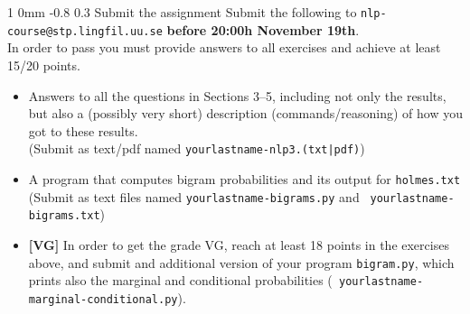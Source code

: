 \documentclass[11pt]{article}
\makeatletter
\newcommand{\newsec}[2]{\section{#1}\label{sec:#2}\noindent}
\renewcommand{\section}{\@startsection
{section}%
{1}%
{0mm}%
{-0.8\baselineskip}%
{0.3\baselineskip}%
{\bfseries\large}}%
\makeatother
\begin{document}
\newsec{Submit the assignment}{submit}%
Submit the following to {\tt nlp-course@stp.lingfil.uu.se} {\bf before
  20:00h November 19th}.\\In order to pass you must provide answers to
all exercises and achieve at least 15/20 points.
\begin{itemize}[noitemsep,topsep=0.2cm]
\item Answers to all the questions in Sections 3--5, including not
  only the results, but also a (possibly very short) description
  (commands/reasoning) of how you got to these
  results.\\ %
  (Submit as text/pdf named {\tt yourlastname-nlp3.(txt|pdf)})
\item A program that computes bigram probabilities and its output for {\tt holmes.txt}\\
  (Submit as text files named {\tt yourlastname-bigrams.py} and {\tt
    yourlastname-bigrams.txt})
\item \textbf{[VG]} In order to get the grade VG, reach at least 18
  points in the exercises above, and submit and additional version of
  your program {\tt bigram.py}, which prints also the marginal and
  conditional probabilities ({\tt
    yourlastname-marginal-conditional.py}).
\end{itemize}
\end{document}
